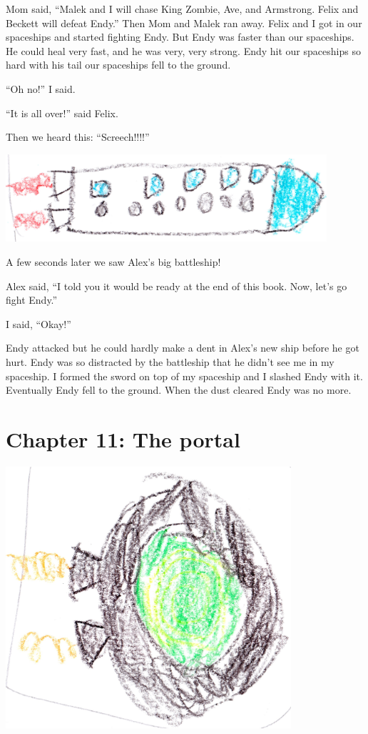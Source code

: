 \documentclass[12pt,oneside]{krantz}
\begin{document}
Mom said, ``Malek and I will chase King Zombie, Ave, and Armstrong.
Felix and Beckett will defeat Endy.'' Then Mom and Malek ran away. Felix
and I got in our spaceships and started fighting Endy. But Endy was
faster than our spaceships. He could heal very fast, and he was very,
very strong. Endy hit our spaceships so hard with his tail our
spaceships fell to the ground.

``Oh no!'' I said.

``It is all over!'' said Felix.

Then we heard this: ``Screech!!!!''

\includegraphics[width=4.6875in,height=\textheight]{img/four-bad-guys/longrocket.jpg}

A few seconds later we saw Alex's big battleship!

Alex said, ``I told you it would be ready at the end of this book. Now,
let's go fight Endy.''

I said, ``Okay!''

Endy attacked but he could hardly make a dent in Alex's new ship before
he got hurt. Endy was so distracted by the battleship that he didn't see
me in my spaceship. I formed the sword on top of my spaceship and I
slashed Endy with it. Eventually Endy fell to the ground. When the dust
cleared Endy was no more.

\hypertarget{chapter-11-the-portal}{%
\chapter*{Chapter 11: The portal}\label{chapter-11-the-portal}}


\includegraphics[width=4.16667in,height=\textheight]{img/four-bad-guys/portal.jpg}
\end{document}

